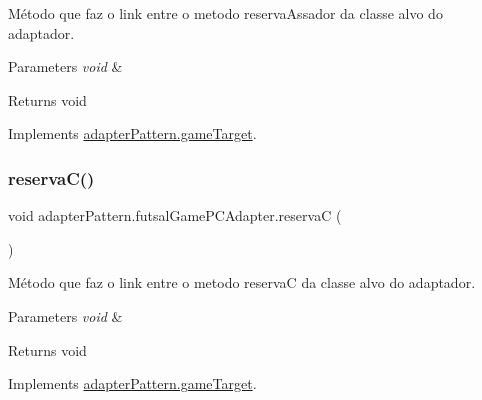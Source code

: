 Método que faz o link entre o metodo reserva\+Assador da classe alvo do adaptador. 


\begin{DoxyParams}{Parameters}
{\em void} & \\
\hline
\end{DoxyParams}
\begin{DoxyReturn}{Returns}
void 
\end{DoxyReturn}


Implements \mbox{\hyperlink{interfaceadapter_pattern_1_1game_target_a67348260f14d11e317195e2d66dbff18}{adapter\+Pattern.\+game\+Target}}.

\mbox{\label{classadapter_pattern_1_1futsal_game_p_c_adapter_a21ee21ef721544394d4b3986651b7585}} 
\subsubsection{\texorpdfstring{reservaC()}{reservaC()}}
{\footnotesize\ttfamily void adapter\+Pattern.\+futsal\+Game\+P\+C\+Adapter.\+reservaC (\begin{DoxyParamCaption}{ }\end{DoxyParamCaption})}



Método que faz o link entre o metodo reservaC da classe alvo do adaptador. 


\begin{DoxyParams}{Parameters}
{\em void} & \\
\hline
\end{DoxyParams}
\begin{DoxyReturn}{Returns}
void 
\end{DoxyReturn}


Implements \mbox{\hyperlink{interfaceadapter_pattern_1_1game_target_ae8c1c944929700a3e120e641118c9188}{adapter\+Pattern.\+game\+Target}}.

\mbox{\label{classadapter_pattern_1_1futsal_game_p_c_adapter_ab7e29595aed0c0f7e9c706acf4cb2335}} 
